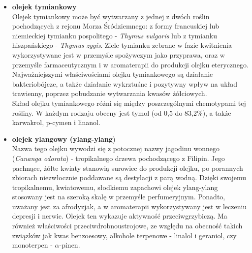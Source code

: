 \documentclass[11pt,a4paper]{report}
\begin{document}
\begin{itemize}
\item \textbf{olejek tymiankowy}\\
Olejek tymiankowy może być wytwarzany z jednej z dwóch roślin pochodzących z rejonu Morza Śródziemnego: z formy francuskiej lub niemieckiej tymianku pospolitego - \textit{Thymus vulgaris} lub z tymianku hiszpańskiego - \textit{Thymus zygis}. Ziele tymianku zebrane w fazie kwitnienia wykorzystywane jest w przemyśle spożywczym jako przyprawa, oraz w przemyśle farmaceutycznym i w aromaterapii do produkcji olejku eterycznego. Najważniejszymi właściwościami olejku tymiankowego są działanie bakteriobójcze, a także działanie wykrztuśne i pozytywny wpływ na układ trawienny, poprzez pobudzanie wytwarzania kwasów żółciowych\cite{lis}.\\
Skład olejku tymiankowego różni się między poszczególnymi chemotypami tej rośliny. W każdym rodzaju obecny jest tymol (od 0,5 do 83,2$\%$), a także karwakrol, p-cymen i linanol\cite{Lawr, lis}.


\item \textbf{olejek ylangowy (ylang-ylang})\\
Nazwa tego olejku wywodzi się z potocznej nazwy jagodinu wonnego (\textit{Cananga odorata}) - tropikalnego drzewa pochodzącego z Filipin. Jego pachnące, żółte kwiaty stanowią surowiec do produkcji olejku, po porannych zbiorach niezwłocznie poddawane są destylacji z parą wodną. 
Dzięki swojemu tropikalnemu, kwiatowemu, słodkiemu zapachowi olejek ylang-ylang stosowany jest na szeroką skalę w przemyśle perfumeryjnym\cite{gorailis}. 
Ponadto, uważany jest za afrodyzjak, a w aromaterapii wykorzystywany jest w leczeniu depresji i nerwic\cite{pollena_y}. 
Olejek ten wykazuje aktywność przeciwgrzybiczą\cite{hammer}. Ma również właściwości przeciwdrobnoustrojowe, ze względu na obecność takich związków jak kwas benzoesowy, alkohole terpenowe - linalol i geraniol, czy monoterpen - $\alpha$-pinen\cite{kedzia_ylang}. 





\end{itemize}
\end{document}
